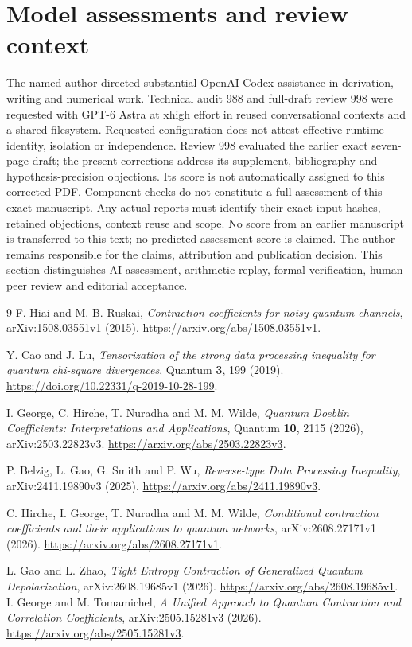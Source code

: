 \documentclass[11pt]{article}
\theoremstyle{remark}
\begin{document}
\section{Model assessments and review context}
The named author directed substantial OpenAI Codex assistance in derivation, writing and numerical work.
Technical audit 988 and full-draft review 998 were requested with GPT-6 Astra at xhigh effort in reused conversational contexts and a shared filesystem. Requested configuration does not attest effective runtime identity, isolation or independence. Review 998 evaluated the earlier exact seven-page draft; the present corrections address its supplement, bibliography and hypothesis-precision objections. Its score is not automatically assigned to this corrected PDF.
Component checks do not constitute a full assessment of this exact manuscript.
Any actual reports must identify their exact input hashes, retained objections, context reuse and scope.
No score from an earlier manuscript is transferred to this text; no predicted assessment score is claimed.
The author remains responsible for the claims, attribution and publication decision.
This section distinguishes AI assessment, arithmetic replay, formal verification, human peer review and editorial acceptance.

\small
\begin{thebibliography}{9}
F. Hiai and M. B. Ruskai,
\emph{Contraction coefficients for noisy quantum channels},
arXiv:1508.03551v1 (2015).
\url{https://arxiv.org/abs/1508.03551v1}.

Y. Cao and J. Lu,
\emph{Tensorization of the strong data processing inequality for quantum chi-square divergences},
Quantum \textbf{3}, 199 (2019).
\url{https://doi.org/10.22331/q-2019-10-28-199}.

I. George, C. Hirche, T. Nuradha and M. M. Wilde,
\emph{Quantum Doeblin Coefficients: Interpretations and Applications},
Quantum \textbf{10}, 2115 (2026), arXiv:2503.22823v3.
\url{https://arxiv.org/abs/2503.22823v3}.

P. Belzig, L. Gao, G. Smith and P. Wu,
\emph{Reverse-type Data Processing Inequality},
arXiv:2411.19890v3 (2025).
\url{https://arxiv.org/abs/2411.19890v3}.

C. Hirche, I. George, T. Nuradha and M. M. Wilde,
\emph{Conditional contraction coefficients and their applications to quantum networks},
arXiv:2608.27171v1 (2026).
\url{https://arxiv.org/abs/2608.27171v1}.

L. Gao and L. Zhao,
\emph{Tight Entropy Contraction of Generalized Quantum Depolarization},
arXiv:2608.19685v1 (2026).
\url{https://arxiv.org/abs/2608.19685v1}.
I. George and M. Tomamichel,
\emph{A Unified Approach to Quantum Contraction and Correlation Coefficients},
arXiv:2505.15281v3 (2026).
\url{https://arxiv.org/abs/2505.15281v3}.

\end{thebibliography}
\end{document}
